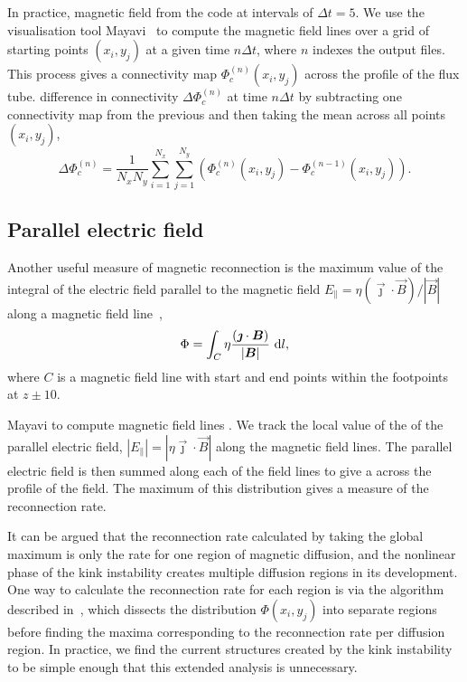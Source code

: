 In practice, magnetic field  from the code at
intervals of $\Delta t = 5$. We use the visualisation tool
Mayavi~\cite{ramachandran2011mayavi} to compute the magnetic field
lines over a grid of starting points $(x_i, y_j)$ at a given time $n
\Delta t$, where $n$ indexes the output files. This process gives a
connectivity map $\Phi_c^{(n)}(x_i, y_j)$ across the profile of the
flux tube.  difference in connectivity $\Delta
\Phi_c^{(n)}$ at time $n\Delta t$  by subtracting one connectivity map from the previous and then taking the mean across all points $(x_i, y_j)$,
\begin{equation}
  \Delta \Phi_c^{(n)} = \frac{1}{N_x N_y} \sum_{i=1}^{N_x} \sum_{j=1}^{N_y} (\Phi_c^{(n)}(x_i, y_j) - \Phi_c^{(n-1)}(x_i, y_j)).
\end{equation}

\subsection{Parallel electric field}

Another useful measure of magnetic reconnection is the maximum value of the integral of the electric field parallel to the magnetic field $E_{\parallel} = \eta {(\vec{\jmath} \cdot \vec{B})}/|\vec{B}|$ along a magnetic field line~\cite{galsgaardSteadyStateReconnection2011,priestNatureThreedimensionalMagnetic2003,schindlerGeneralMagneticReconnection1988},
\begin{equation}
  \Phi = \int_{C} \eta \frac{(\vec{\jmath} \cdot \vec{B})}{|\vec{B}|}\ {\rm d}l,
\end{equation}
where $C$ is a magnetic field line with start and end points within the footpoints at $z\pm10$.

 Mayavi to
compute magnetic field lines . We track the local value of
the  of the parallel electric field, $|E_{\parallel}| =
|\eta \vec{\jmath} \cdot \vec{B}|$ along the magnetic field lines. The
parallel electric field is then summed along each of the field lines
to give a  across the profile of the field. The maximum of this distribution gives a measure of the reconnection rate.

It can be argued that the reconnection rate calculated by taking the global maximum is only the rate for one region of magnetic diffusion, and the nonlinear phase of the kink instability creates multiple diffusion regions in its development. One way to calculate the reconnection rate for each region is via the algorithm described in~\cite{pontinDynamicsBraidedCoronal2011}, which dissects the distribution $\Phi(x_i, y_j)$ into separate regions before finding the maxima corresponding to the reconnection rate per diffusion region. In practice, we find the current structures created by the kink instability to be simple enough that this extended analysis is unnecessary.

